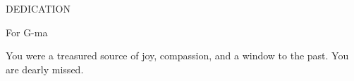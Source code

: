 \begin{center}
DEDICATION

\hspace{15cm}

For G-ma

You were a treasured source of joy, compassion, and a window to the past. You are dearly missed.

\end{center}
